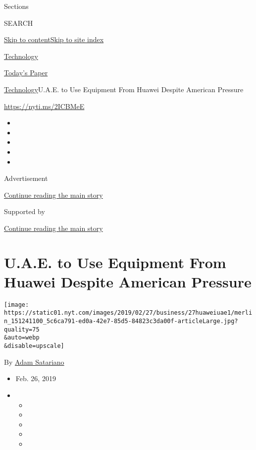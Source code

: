 Sections

SEARCH

\protect\hyperlink{site-content}{Skip to
content}\protect\hyperlink{site-index}{Skip to site index}

\href{https://www.nytimes.com/section/technology}{Technology}

\href{https://myaccount.nytimes.com/auth/login?response_type=cookie\&client_id=vi}{}

\href{https://www.nytimes.com/section/todayspaper}{Today's Paper}

\href{/section/technology}{Technology}\textbar{}U.A.E. to Use Equipment
From Huawei Despite American Pressure

\url{https://nyti.ms/2ICBMeE}

\begin{itemize}
\item
\item
\item
\item
\item
\end{itemize}

Advertisement

\protect\hyperlink{after-top}{Continue reading the main story}

Supported by

\protect\hyperlink{after-sponsor}{Continue reading the main story}

\hypertarget{uae-to-use-equipment-from-huawei-despite-american-pressure}{%
\section{U.A.E. to Use Equipment From Huawei Despite American
Pressure}\label{uae-to-use-equipment-from-huawei-despite-american-pressure}}

\texttt{[image: https://static01.nyt.com/images/2019/02/27/business/27huaweiuae1/merlin\_151241100\_5c6ca791-ed0a-42e7-85d5-84823c3da00f-articleLarge.jpg?quality=75\\\&auto=webp\\\&disable=upscale]}

By \href{https://www.nytimes.com/by/adam-satariano}{Adam Satariano}

\begin{itemize}
\item
  Feb. 26, 2019
\item
  \begin{itemize}
  \item
  \item
  \item
  \item
  \item
  \end{itemize}
\end{itemize}


